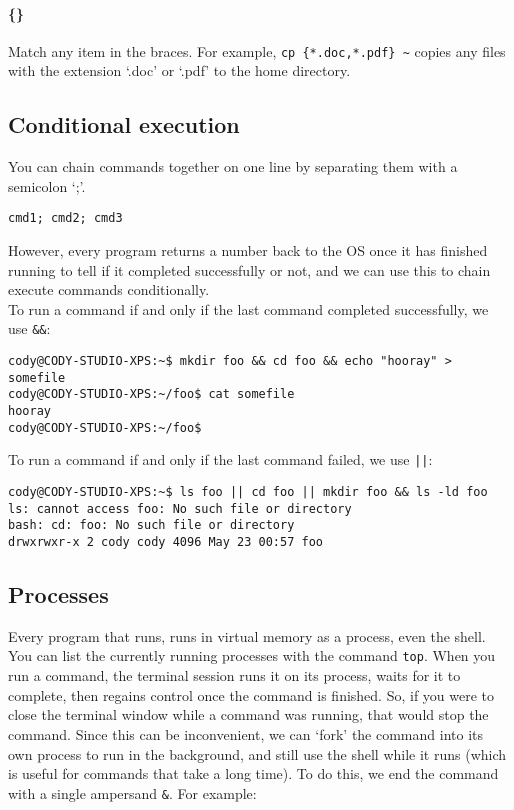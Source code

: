 \documentclass{article}
\begin{document}
\paragraph{\{\}}
Match any item in the braces. For example, \texttt{cp \{*.doc,*.pdf\} \textasciitilde} copies any files with the extension `.doc' or `.pdf' to the home directory.

\subsection{Conditional execution}
You can chain commands together on one line by separating them with a semicolon `;'.
\begin{verbatim}
cmd1; cmd2; cmd3
\end{verbatim}
However, every program returns a number back to the OS once it has finished running to tell if it completed successfully or not, and we can use this to chain execute commands conditionally.\\
To run a command if and only if the last command completed successfully, we use \texttt{\&\&}:

\begin{verbatim}
cody@CODY-STUDIO-XPS:~$ mkdir foo && cd foo && echo "hooray" > somefile
cody@CODY-STUDIO-XPS:~/foo$ cat somefile 
hooray
cody@CODY-STUDIO-XPS:~/foo$
\end{verbatim}
To run a command if and only if the last command failed, we use \texttt{||}:

\begin{verbatim}
cody@CODY-STUDIO-XPS:~$ ls foo || cd foo || mkdir foo && ls -ld foo
ls: cannot access foo: No such file or directory
bash: cd: foo: No such file or directory
drwxrwxr-x 2 cody cody 4096 May 23 00:57 foo
\end{verbatim}

\subsection{Processes}
Every program that runs, runs in virtual memory as a process, even the shell. You can list the currently running processes with the command \texttt{top}.
When you run a command, the terminal session runs it on its process, waits for it to complete, then regains control once the command is finished. So, if you were to close the terminal window while a command was running, that would stop the command. Since this can be inconvenient, we can `fork' the command into its own process to run in the background, and still use the shell while it runs (which is useful for commands that take a long time). To do this, we end the command with a single ampersand \texttt{\&}. For example:
\end{document}
